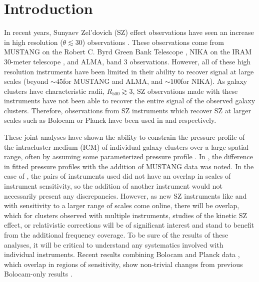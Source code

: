 \documentclass[twocolumn,traditabstract]{aa}
\begin{document}
\maketitle

\section{Introduction}
\label{sec:intro}


In recent years, Sunyaev Zel'dovich (SZ) effect observations have seen an increase in high resolution ($\theta \lesssim 30$\asecs)
observations \citep[e.g.][]{mason2010,adam2014,kitayama2016}. These observations come from MUSTANG on the
Robert C. Byrd Green Bank Telescope \citep[GBT][]{dicker2008}, NIKA on the IRAM 30-meter telescope \citep{monfardini2010},
and ALMA, band 3 observations. However, all of these high resolution instruments have been limited in their ability to
recover signal at large scales (beyond $\sim 45$\asecs for MUSTANG and ALMA, and $\sim 100$\asecs for NIKA). As galaxy clusters
have characteristic radii, $R_{500} \gtrsim 3$\amin, SZ observations made with these instruments have not been able to recover the
entire signal of the observed galaxy clusters. Therefore, observations from SZ instruments which recover SZ at larger scales
such as Bolocam \citet{czakon2015} or Planck \citep{planck2013a} have been used in \citet{romero2015a} and \citet{adam2014} respectively.

These joint analyses have shown the ability to constrain the pressure profile of the intracluster medium (ICM) of individual
galaxy clusters over a large spatial range, often by assuming some parameterized pressure profile \citep[e.g.][]{romero2016,adam2014}.
In \citet{romero2015a}, the difference in fitted pressure profiles with the addition of MUSTANG data was noted. In the case of
\citet{romero2016,adam2014}, the pairs of instruments used did not have an overlap in scales of instrument sensitivity, so the
addition of another instrument would not necessarily present any discrepancies. However, as new SZ instruments like
\citep[NIKA2][]{monfardini2014} and \citep[MUSTANG2][]{dicker2014a} with sensitivity to
a larger range of scales come online, there will be overlap, which for clusters observed with
multiple instruments, studies of the kinetic SZ effect, or relativistic corrections \citep{itoh1998} will be of significant interest and
stand to benefit from the additional frequency coverage. To be sure of the results of these analyses, it will be critical to
understand any systematics involved with individual instruments. Recent results combining Bolocam and Planck data \citep{sayers2016},
which overlap in regions of sensitivity, show non-trivial changes from previous Bolocam-only results \citep{sayers2013}.
\end{document}
